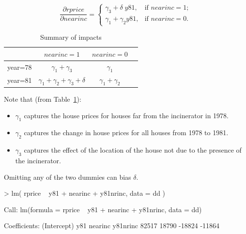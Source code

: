\documentclass[landscape,letterpaper,9pt]{article}
\begin{document}
\[\frac{\partial rprice}{\partial  nearinc} =
\begin{cases}
    \gamma_3 + \delta \;y81, &\text{if $nearinc=1$}; \\
     \gamma_1 + \gamma_2 y81  , &\text{if $nearinc=0$}.
\end{cases}
\]

\begin{table}[h!]\caption{Summary of impacts}\label{tab:imp}
     \begin{center}
        \begin{tabular}{|c|c|c|c}\hline
             & $nearinc=1$           & $nearinc=0$ \\ \hline
     year=78 & $\gamma_1+\gamma_3$ & $\gamma_1$ \\ \hline
     year=81 & $\gamma_1+\gamma_2 +\gamma_3 + \delta$ & $\gamma_1 + \gamma_2$ \\
    \hline
\end{tabular} \vspace{-.2in}
\end{center}
\end{table}
Note that (from Table~\ref{tab:imp}):
\begin{itemize}
\item \(\gamma_1\) captures the house prices for  houses far from  the incinerator in  1978.
\item \(\gamma_2\) captures the change in house prices for all houses from 1978 to 1981.
\item \(\gamma_3\) captures the effect of the location of the house not due to the presence of
 the incinerator.
\end{itemize}
Omitting any of the two dummies can bias \(\delta\).
\newpage
\begin{CVerbatim}
> lm( rprice ~ y81 + nearinc + y81nrinc, data = dd )

Call:
lm(formula = rprice ~ y81 + nearinc + y81nrinc, data = dd)

Coefficients:
(Intercept)          y81      nearinc     y81nrinc
      82517        18790       -18824       -11864

\end{CVerbatim}
%
%
%
\end{document}
